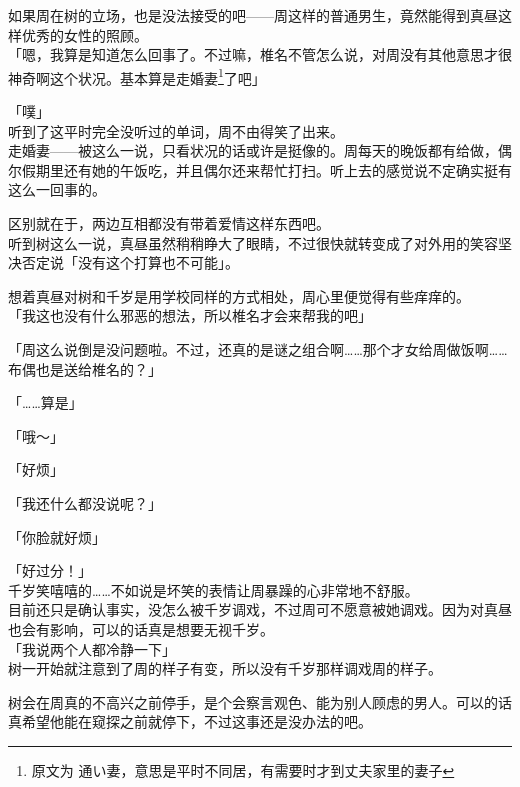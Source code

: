 如果周在树的立场，也是没法接受的吧——周这样的普通男生，竟然能得到真昼这样优秀的女性的照顾。\\

「嗯，我算是知道怎么回事了。不过嘛，椎名不管怎么说，对周没有其他意思才很神奇啊这个状况。基本算是走婚妻\footnote{原文为 {\jpfont 通い妻}，意思是平时不同居，有需要时才到丈夫家里的妻子}了吧」

「噗」\\

听到了这平时完全没听过的单词，周不由得笑了出来。\\

走婚妻——被这么一说，只看状况的话或许是挺像的。周每天的晚饭都有给做，偶尔假期里还有她的午饭吃，并且偶尔还来帮忙打扫。听上去的感觉说不定确实挺有这么一回事的。

区别就在于，两边互相都没有带着爱情这样东西吧。\\

听到树这么一说，真昼虽然稍稍睁大了眼睛，不过很快就转变成了对外用的笑容坚决否定说「没有这个打算也不可能」。

想着真昼对树和千岁是用学校同样的方式相处，周心里便觉得有些痒痒的。\\

「我这也没有什么邪恶的想法，所以椎名才会来帮我的吧」

「周这么说倒是没问题啦。不过，还真的是谜之组合啊……那个才女给周做饭啊……布偶也是送给椎名的？」

「……算是」

「哦～」

「好烦」

「我还什么都没说呢？」

「你脸就好烦」

「好过分！」\\

千岁笑嘻嘻的……不如说是坏笑的表情让周暴躁的心非常地不舒服。\\

目前还只是确认事实，没怎么被千岁调戏，不过周可不愿意被她调戏。因为对真昼也会有影响，可以的话真是想要无视千岁。\\

「我说两个人都冷静一下」\\

树一开始就注意到了周的样子有变，所以没有千岁那样调戏周的样子。

树会在周真的不高兴之前停手，是个会察言观色、能为别人顾虑的男人。可以的话真希望他能在窥探之前就停下，不过这事还是没办法的吧。\\

